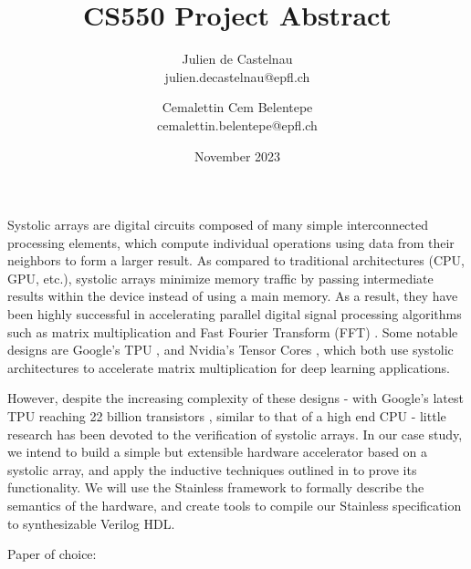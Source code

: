 \documentclass{article}
\title{CS550 Project Abstract}
\author{Julien de Castelnau \\ julien.decastelnau@epfl.ch \and Cemalettin Cem Belentepe\\cemalettin.belentepe@epfl.ch}
\date{November 2023}
\begin{document}
\maketitle

Systolic arrays are digital circuits composed of many simple interconnected processing elements, which compute individual operations using data from their neighbors to form a larger result. As compared to traditional architectures (CPU, GPU, etc.), systolic arrays minimize memory traffic by passing intermediate results within the device instead of using a main memory. As a result, they have been highly successful in accelerating parallel digital signal processing algorithms such as matrix multiplication and Fast Fourier Transform (FFT) \cite{540529}. Some notable designs are Google's TPU \cite{46078}, and Nvidia's Tensor Cores \cite{9361255}, which both use systolic architectures to accelerate matrix multiplication for deep learning applications. 

However, despite the increasing complexity of these designs - with Google's latest TPU reaching 22 billion transistors \cite{jouppi2023tpu}, similar to that of a high end CPU - little research has been devoted to the verification of systolic arrays. In our case study, we intend to build a simple but extensible hardware accelerator based on a systolic array, and apply the inductive techniques outlined in \cite{226555} to prove its functionality. We will use the Stainless framework to formally describe the semantics of the hardware, and create tools to compile our Stainless specification to synthesizable Verilog HDL.

\vspace{1em}

Paper of choice: \cite{226555}




\end{document}
